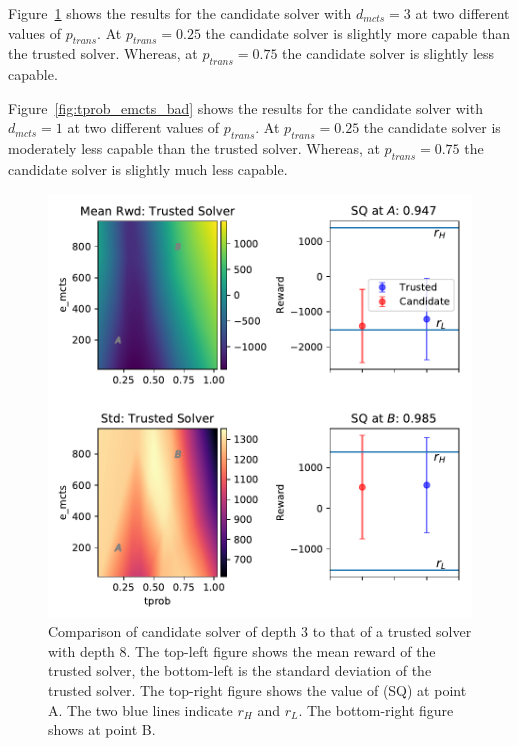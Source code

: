 Figure~\ref{fig:tprob_emcts_ok} shows the results for the candidate solver with $d_{mcts}=3$ at two different values of $p_{trans}$. At $p_{trans}=0.25$ the candidate solver is slightly more capable than the trusted solver. Whereas, at $p_{trans}=0.75$ the candidate solver is slightly less capable.

Figure~\ref{fig:tprob_emcts_bad} shows the results for the candidate solver with $d_{mcts}=1$ at two different values of $p_{trans}$. At $p_{trans}=0.25$ the candidate solver is moderately less capable than the trusted solver. Whereas, at $p_{trans}=0.75$ the candidate solver is slightly much less capable.

\begin{figure}[tbp]
    \centering
    \includegraphics[width=0.9\linewidth]{Figures/transition_e_vary_e_mctstprob_ok.pdf}
    \caption{Comparison of candidate solver of depth 3 to that of a trusted solver with depth 8. The top-left figure shows the mean reward of the trusted solver, the bottom-left is the standard deviation of the trusted solver. The top-right figure shows the value of \xQ{} (SQ) at point A. The two blue lines indicate $r_H$ and $r_L$. The bottom-right figure shows \xQ{} at point B.}
    \label{fig:tprob_emcts_ok}
\end{figure}
